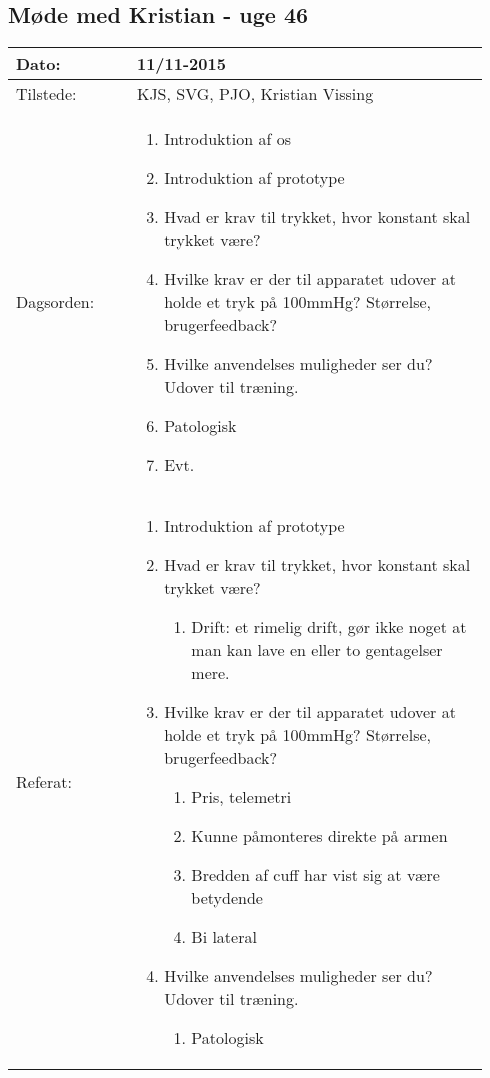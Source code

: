 	\subsection{Møde med Kristian - uge 46}
	\begin{longtable}{|p{0.24\linewidth}|p{0.7\linewidth}|}
		\hline
		Dato: & 11/11-2015\\ \hline
		Tilstede: & KJS, SVG, PJO, Kristian Vissing\\ \hline
		Dagsorden: &
		\begin{enumerate}
			\item Introduktion af os
			\item Introduktion af prototype
			\item Hvad er krav til trykket, hvor konstant skal trykket være?
			\item Hvilke krav er der til apparatet udover at holde et tryk på 100mmHg? Størrelse, brugerfeedback? 
			\item Hvilke anvendelses muligheder ser du? Udover til træning. 
			\item Patologisk
			\item Evt.
		\end{enumerate}
		\\ \hline
		Referat: & 
		\begin{enumerate}
			\item Introduktion af prototype
			\item Hvad er krav til trykket, hvor konstant skal trykket være?
			\begin{enumerate}
				\item Drift: et rimelig drift, gør ikke noget at man kan lave en eller to gentagelser mere. 
			\end{enumerate}
			\item Hvilke krav er der til apparatet udover at holde et tryk på 100mmHg? Størrelse, brugerfeedback? 
			\begin{enumerate}
				\item Pris, telemetri
				\item Kunne påmonteres direkte på armen
				\item Bredden af cuff har vist sig at være betydende
				\item Bi lateral 
			\end{enumerate}
			\item Hvilke anvendelses muligheder ser du? Udover til træning. 
			\begin{enumerate}
				\item Patologisk
				\begin{enumerate}

\end{enumerate}
\end{enumerate}
\end{enumerate}
\end{longtable}
